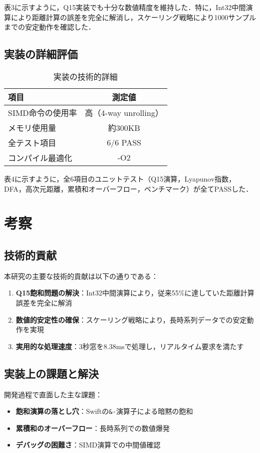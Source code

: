 \documentclass[10pt,twocolumn]{article}
\begin{document}
\begin{CJK}{UTF8}{min}
表3に示すように，Q15実装でも十分な数値精度を維持した．特に，Int32中間演算により距離計算の誤差を完全に解消し，スケーリング戦略により1000サンプルまでの安定動作を確認した．

\subsection{実装の詳細評価}

\begin{table}[t]
\caption{実装の技術的詳細}
\centering
\begin{tabular}{lc}
\toprule
項目 & 測定値 \\
\midrule
SIMD命令の使用率 & 高（4-way unrolling） \\
メモリ使用量 & 約300KB \\
全テスト項目 & 6/6 PASS \\
コンパイル最適化 & -O2 \\
\bottomrule
\end{tabular}
\end{table}

表4に示すように，全6項目のユニットテスト（Q15演算，Lyapunov指数，DFA，高次元距離，累積和オーバーフロー，ベンチマーク）が全てPASSした．

\section{考察}

\subsection{技術的貢献}

本研究の主要な技術的貢献は以下の通りである：

\begin{enumerate}
\item \textbf{Q15飽和問題の解決}：Int32中間演算により，従来55\%に達していた距離計算誤差を完全に解消
\item \textbf{数値的安定性の確保}：スケーリング戦略により，長時系列データでの安定動作を実現
\item \textbf{実用的な処理速度}：3秒窓を8.38msで処理し，リアルタイム要求を満たす
\end{enumerate}

\subsection{実装上の課題と解決}

開発過程で直面した主な課題：
\begin{itemize}
\item \textbf{飽和演算の落とし穴}：Swiftの\verb|&-|演算子による暗黙の飽和
\item \textbf{累積和のオーバーフロー}：長時系列での数値爆発
\item \textbf{デバッグの困難さ}：SIMD演算での中間値確認
\end{itemize}


\end{CJK}
\end{document}
